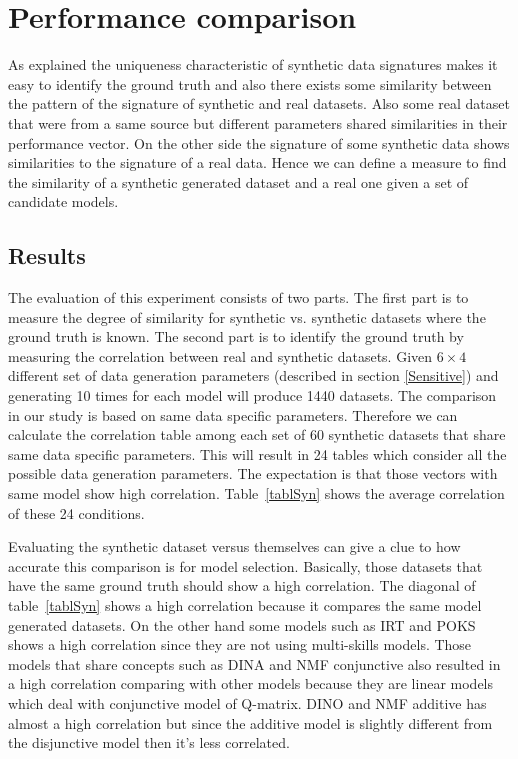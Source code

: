 \section{Performance comparison}
 
As explained the uniqueness characteristic of synthetic data signatures makes it easy to identify the ground truth and also there exists some similarity between the pattern of the signature of synthetic and real datasets. Also some real dataset that were from a same source but different parameters shared similarities in their performance vector. On the other side the signature of some synthetic data shows similarities to the signature of a real data. Hence we can define a measure to find the similarity of a synthetic generated dataset and a real one given a set of candidate models.

\subsection{Results}


The evaluation of this experiment consists of two parts. The first part is to measure the degree of similarity for synthetic vs. synthetic datasets where the ground truth is known. The second part is to identify the ground truth by measuring the correlation between real and synthetic datasets. 
Given $6\times 4$ different set of data generation parameters (described in section \ref{Sensitive}) and generating 10 times for each model will produce 1440 datasets. The comparison in our study is based on same data specific parameters. Therefore we can calculate the correlation table among each set of 60 synthetic datasets that share same data specific parameters. This will result in 24 tables which consider all the possible data generation parameters. The expectation is that those vectors with same model show high correlation. Table~\ref{tablSyn} shows the average correlation of these 24  conditions.

Evaluating the synthetic dataset versus themselves can give a clue to how accurate this comparison is for model selection. Basically, those datasets that have the same ground truth should show a high correlation. The diagonal of table~\ref{tablSyn} shows a high correlation because it compares the same model generated datasets. On the other hand some models such as IRT and POKS shows a high correlation since they are not using multi-skills models. Those models that share concepts such as DINA and NMF conjunctive also resulted in a high correlation comparing with other models because they are linear models which deal with conjunctive model of Q-matrix. DINO and NMF additive has almost a high correlation but since the additive model is slightly different from the disjunctive model then it's less correlated.


